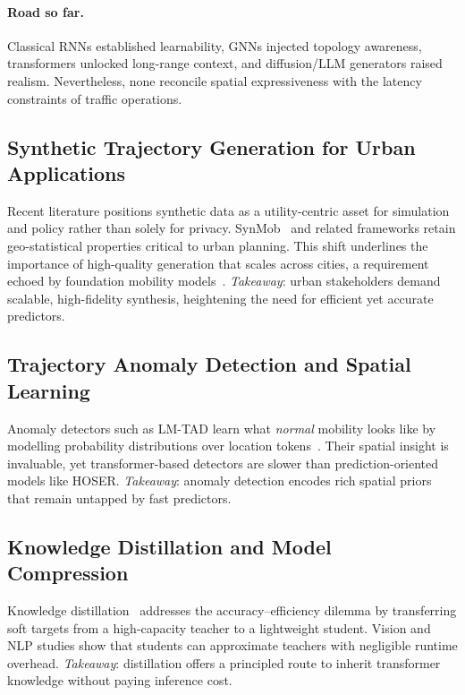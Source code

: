 \paragraph{Road so far.}  Classical RNNs established learnability, GNNs injected topology awareness, transformers unlocked long-range context, and diffusion/LLM generators raised realism.  Nevertheless, none reconcile spatial expressiveness with the latency constraints of traffic operations.

\subsection{Synthetic Trajectory Generation for Urban Applications}
\label{sec:lit-synthetic-urban}
Recent literature positions synthetic data as a utility-centric asset for simulation and policy rather than solely for privacy.  SynMob~\cite{zhuSynMobCreatingHighFidelity} and related frameworks retain geo-statistical properties critical to urban planning.  This shift underlines the importance of high-quality generation that scales across cities, a requirement echoed by foundation mobility models~\cite{maLearningUniversalHuman2025}.  \textit{Takeaway}: urban stakeholders demand scalable, high-fidelity synthesis, heightening the need for efficient yet accurate predictors.

\subsection{Trajectory Anomaly Detection and Spatial Learning}
\label{sec:lit-anomaly-spatial}
Anomaly detectors such as LM-TAD learn what \emph{normal} mobility looks like by modelling probability distributions over location tokens~\cite{heSpatiotemporalTrajectoryAnomaly2022,kongMobileTrajectoryAnomaly2024}.  Their spatial insight is invaluable, yet transformer-based detectors are slower than prediction-oriented models like HOSER.  \textit{Takeaway}: anomaly detection encodes rich spatial priors that remain untapped by fast predictors.

\subsection{Knowledge Distillation and Model Compression}
\label{sec:lit-distill}
Knowledge distillation~\cite{hintonDistillingKnowledgeNeural2015} addresses the accuracy–efficiency dilemma by transferring soft targets from a high-capacity teacher to a lightweight student.  Vision and NLP studies show that students can approximate teachers with negligible runtime overhead.  \textit{Takeaway}: distillation offers a principled route to inherit transformer knowledge without paying inference cost.

